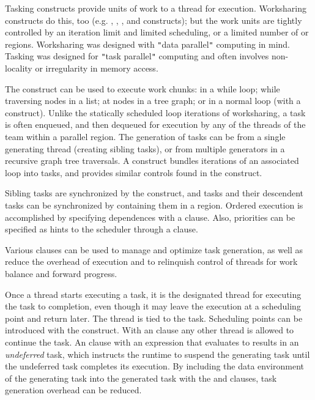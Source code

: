 \label{chap:tasking}

Tasking constructs provide units of work to a thread for execution.  
Worksharing constructs do this, too (e.g. , , 
, and  constructs); 
but the work units are tightly controlled by an iteration limit and limited 
scheduling, or a limited number of  or  regions. 
Worksharing was designed 
with \texttt{"}data parallel\texttt{"} computing in mind.  Tasking was designed for 
\texttt{"}task parallel\texttt{"} computing and often involves non-locality or irregularity 
in memory access.

The  construct can be used to execute work chunks: in a while loop; 
while traversing nodes in a list; at nodes in a tree graph; 
or in a normal loop (with a  construct).  
Unlike the statically scheduled loop iterations of worksharing, a task is 
often enqueued, and then dequeued for execution by any of the threads of the
team within a parallel region. The generation of tasks can be from a single 
generating thread (creating sibling tasks), or from multiple generators
in a recursive graph tree traversals. 
A  construct
bundles iterations of an associated loop into tasks, and provides 
similar controls found in the  construct.

Sibling tasks are synchronized by the  construct, and tasks
and their descendent tasks can be synchronized by containing them in
a  region.  Ordered execution is accomplished by specifying
dependences with a  clause. Also, priorities can be
specified as hints to the scheduler through a  clause.

Various clauses can be used to manage and optimize task generation,
as well as reduce the overhead of execution and to relinquish 
control of threads for work balance and forward progress. 

Once a thread starts executing a task, it is the designated thread 
for executing the task to completion, even though it may leave the
execution at a scheduling point and return later.  The thread is tied
to the task.  Scheduling points can be introduced with the 
construct.  With an  clause any other thread is allowed to continue
the task.  An  clause with an expression that evaluates to  
results in an \emph{undeferred} task, which instructs the runtime to suspend
the generating task until the undeferred task completes its execution.
By including the data environment of the generating task into the generated task with the 
 and  clauses, task generation overhead can be reduced.

